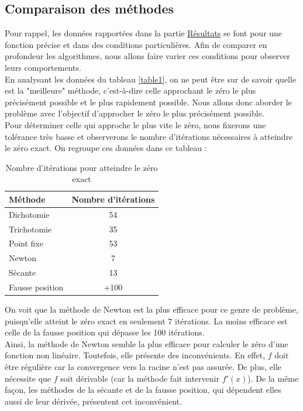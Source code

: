\documentclass[12pt]{article}
\begin{document}
\subsection{Comparaison des méthodes}
\noindent Pour rappel, les données rapportées dans la partie \hyperref[ref:resultats]{Résultats} se font pour une fonction précise et dans des conditions particulières. Afin de comparer en profondeur les algorithmes, nous allons faire varier ces conditions pour observer leurs comportements.\\
En analysant les données du tableau \ref{table1}, on ne peut être sur de savoir quelle est la "meilleure" méthode, c'est-à-dire celle approchant le zéro le plus précisément possible et le plus rapidement possible. Nous allons donc aborder le problème avec l'objectif d'approcher le zéro le plus précisément possible.\\
Pour déterminer celle qui approche le plus vite le zéro, nous fixerons une tolérance très basse et observerons le nombre d'itérations nécessaires à atteindre le zéro exact. On regroupe ces données dans ce tableau :
\begin{table}[H]
\centering
\begin{tabular}{|l|c|}
\hline
\textbf{Méthode} & \textbf{Nombre d'itérations} \\
\hline
Dichotomie & 54\\
Trichotomie & 35\\
Point fixe & 53\\
Newton & 7\\
Sécante & 13\\
Fausse position & +100\\
\hline
\end{tabular}
\caption{Nombre d'itérations pour atteindre le zéro exact}
\label{tab:iterations}
\end{table}
\noindent On voit que la méthode de Newton est la plus efficace pour ce genre de problème, puisqu'elle atteint le zéro exact en seulement 7 itérations. La moins efficace est celle de la fausse position qui dépasse les 100 itérations.\\

\noindent Ainsi, la méthode de Newton semble la plus efficace pour calculer le zéro d'une fonction non linéaire. Toutefois, elle présente des inconvénients. En effet, $f$ doit être régulière car la convergence vers la racine n'est pas assurée. De plus, elle nécessite que $f$ soit dérivable (car la méthode fait intervenir $f'(x)$). De la même façon, les méthodes de la sécante et de la fausse position, qui dépendent elles aussi de leur dérivée, présentent cet inconvénient.\\
\end{document}
